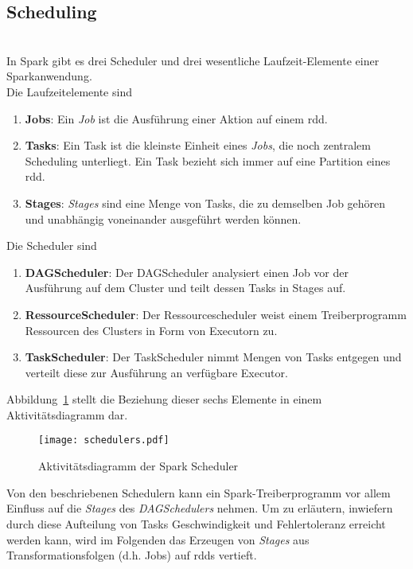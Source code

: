 \subsection{Scheduling}\\

In Spark gibt es drei Scheduler und drei wesentliche Laufzeit-Elemente einer Sparkanwendung.\\

Die Laufzeitelemente sind
\begin{enumerate}
	\item \textbf{Jobs}: Ein \textit{Job} ist die Ausführung einer Aktion auf einem \gls{rdd}.
	\item \textbf{Tasks}: Ein Task ist die kleinste Einheit eines \textit{Jobs}, die noch zentralem Scheduling unterliegt. Ein Task bezieht sich immer auf eine Partition eines \gls{rdd}.
	\item \textbf{Stages}: \textit{Stages} sind eine Menge von Tasks, die zu demselben Job gehören und unabhängig voneinander ausgeführt werden können.
\end{enumerate}

Die Scheduler sind
\begin{enumerate}
	\item \textbf{DAGScheduler}: Der DAGScheduler analysiert einen Job vor der Ausführung auf dem Cluster und teilt dessen Tasks in Stages auf.
	\item \textbf{RessourceScheduler}: Der Ressourcescheduler weist einem Treiberprogramm Ressourcen des Clusters in Form von Executorn zu.
	\item \textbf{TaskScheduler}: Der TaskScheduler nimmt Mengen von Tasks entgegen und verteilt diese zur Ausführung an verfügbare Executor.
\end{enumerate}

Abbildung~\ref{fig:schedulers} stellt die Beziehung dieser sechs Elemente in einem Aktivitätsdiagramm dar.

\begin{figure}[ht!]
	\centering
  \texttt{[image: schedulers.pdf]}
	\caption{Aktivitätsdiagramm der Spark Scheduler}
	\label{fig:schedulers}
\end{figure}

Von den beschriebenen Schedulern kann ein Spark-Treiberprogramm vor allem Einfluss auf die \textit{Stages} des \textit{DAGSchedulers} nehmen.
Um zu erläutern, inwiefern durch diese Aufteilung von Tasks Geschwindigkeit und Fehlertoleranz erreicht werden kann, wird im Folgenden das Erzeugen von \textit{Stages} aus Transformationsfolgen (d.h. Jobs) auf \gls{rdd}s vertieft.\\

